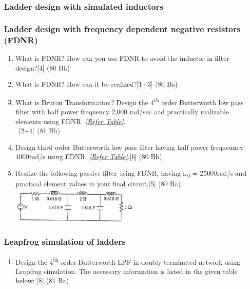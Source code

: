 \documentclass[12pt]{article}
\newcommand{\w}{\(\omega\)}
\newcommand{\enter}{\\\textcolor{white}{1}}
\newcommand{\sub}[1]{\textsubscript{#1}}
\begin{document}
\subsubsection{Ladder design with simulated inductors}
\subsubsection{Ladder design with frequency dependent negative resistors (FDNR)}
\begin{enumerate}
\item What is FDNR? How can you use FDNR to avoid the inductor in filter design?\hfill[4] (80 Bh)
\item What is FDNR? How can it be realized?\hfill [1+3] (80 Ba)
\item What is Bruton Transformation? Design the 4\textsuperscript{th} order Butterworth low pass filter with half power frequency 2,000 rad/sec and practically realizable elements using FDNR. \textit{[\hyperref[sec:tables_81bh]{Refer Table]}}.
\enter\hfill [2+4] (81 Bh)
\item Design third order Butterworth low pass filter having half power frequeuncy 4000rad/s using FDNR. \textit{[\hyperref[sec:tables_81bh]{Refer Table]}}.\hfill [6] (80 Bh)
\item Realize the following passive filter using FDNR, having \w\sub{0} = 25000rad/s and practical element values in your final circuit.\hfill[5] (80 Ba)
\includegraphics[width=0.5\textwidth]{fd_4}
\end{enumerate}
\subsubsection{Leapfrog simulation of ladders}
\begin{enumerate}
\item Design the 4\textsuperscript{th} order Butterworth LPF in doubly-terminated network using Leapfrog simulation. The necessary information is listed in the given table below:\hspace*{20mm} [8] (81 Ba)

\end{enumerate}
\end{document}
